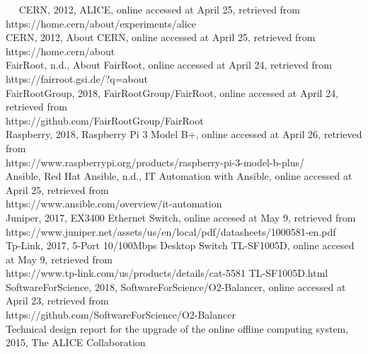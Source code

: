 
~~ CERN, 2012, ALICE, online accessed at April 25, retrieved from \\https://home.cern/about/experiments/alice\\

CERN, 2012, About CERN, online accessed at April 25, retrieved from \\https://home.cern/about\\

FairRoot, n.d., About FairRoot, online accessed at April 24, retrieved from \\https://fairroot.gsi.de/?q=about\\

FairRootGroup, 2018, FairRootGroup/FairRoot, online accessed at April 24, retrieved from \\https://github.com/FairRootGroup/FairRoot\\

Raspberry, 2018, Raspberry Pi 3 Model B+, online accessed at April 26, retrieved from \\https://www.raspberrypi.org/products/raspberry-pi-3-model-b-plus/\\

Ansible, Red Hat Ansible, n.d., IT Automation with Ansible, online accessed at April 25, retrieved from \\https://www.ansible.com/overview/it-automation\\

Juniper, 2017, EX3400 Ethernet Switch, online accesed at May 9, retrieved from \\https://www.juniper.net/assets/us/en/local/pdf/datasheets/1000581-en.pdf\\

Tp-Link, 2017, 5-Port 10/100Mbps Desktop Switch TL-SF1005D, online accesed at May 9, retrieved from \\https://www.tp-link.com/us/products/details/cat-5581 TL-SF1005D.html\\

SoftwareForScience, 2018, SoftwareForScience/O2-Balancer, online accessed at April 23, retrieved from \\https://github.com/SoftwareForScience/O2-Balancer\\

Technical design report for the upgrade of the online offline computing system, 2015, The ALICE Collaboration\\